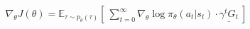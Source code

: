 \begin{align}
\nabla_\theta J(\theta) = \mathbb{E}_{\tau\sim p_\theta(\tau)} \left\lbrack\ \sum_{t=0}^{\infty}\nabla_\theta\log \pi_\theta(a_t|s_t)\cdot \underline{\gamma^t G_t} \ \right\rbrack
\end{align}